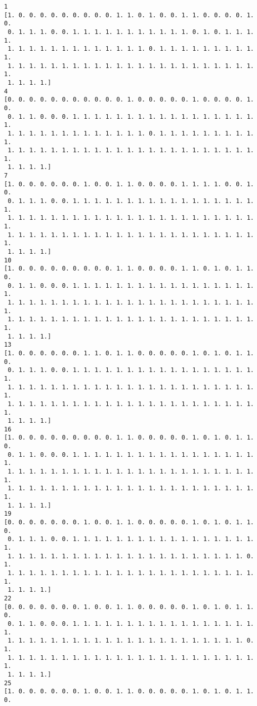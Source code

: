 \documentclass[11pt]{article}
\begin{document}
    \begin{Verbatim}[commandchars=\\\{\}]
1
[1. 0. 0. 0. 0. 0. 0. 0. 0. 0. 1. 1. 0. 1. 0. 0. 1. 1. 0. 0. 0. 0. 1. 0.
 0. 1. 1. 1. 0. 0. 1. 1. 1. 1. 1. 1. 1. 1. 1. 1. 1. 0. 1. 0. 1. 1. 1. 1.
 1. 1. 1. 1. 1. 1. 1. 1. 1. 1. 1. 1. 1. 0. 1. 1. 1. 1. 1. 1. 1. 1. 1. 1.
 1. 1. 1. 1. 1. 1. 1. 1. 1. 1. 1. 1. 1. 1. 1. 1. 1. 1. 1. 1. 1. 1. 1. 1.
 1. 1. 1. 1.]
4
[0. 0. 0. 0. 0. 0. 0. 0. 0. 0. 0. 1. 0. 0. 0. 0. 0. 1. 0. 0. 0. 0. 1. 0.
 0. 1. 1. 0. 0. 0. 1. 1. 1. 1. 1. 1. 1. 1. 1. 1. 1. 1. 1. 1. 1. 1. 1. 1.
 1. 1. 1. 1. 1. 1. 1. 1. 1. 1. 1. 1. 1. 0. 1. 1. 1. 1. 1. 1. 1. 1. 1. 1.
 1. 1. 1. 1. 1. 1. 1. 1. 1. 1. 1. 1. 1. 1. 1. 1. 1. 1. 1. 1. 1. 1. 1. 1.
 1. 1. 1. 1.]
7
[1. 0. 0. 0. 0. 0. 0. 1. 0. 0. 1. 1. 0. 0. 0. 0. 1. 1. 1. 1. 0. 0. 1. 0.
 0. 1. 1. 1. 0. 0. 1. 1. 1. 1. 1. 1. 1. 1. 1. 1. 1. 1. 1. 1. 1. 1. 1. 1.
 1. 1. 1. 1. 1. 1. 1. 1. 1. 1. 1. 1. 1. 1. 1. 1. 1. 1. 1. 1. 1. 1. 1. 1.
 1. 1. 1. 1. 1. 1. 1. 1. 1. 1. 1. 1. 1. 1. 1. 1. 1. 1. 1. 1. 1. 1. 1. 1.
 1. 1. 1. 1.]
10
[1. 0. 0. 0. 0. 0. 0. 0. 0. 0. 1. 1. 0. 0. 0. 0. 1. 1. 0. 1. 0. 1. 1. 0.
 0. 1. 1. 0. 0. 0. 1. 1. 1. 1. 1. 1. 1. 1. 1. 1. 1. 1. 1. 1. 1. 1. 1. 1.
 1. 1. 1. 1. 1. 1. 1. 1. 1. 1. 1. 1. 1. 1. 1. 1. 1. 1. 1. 1. 1. 1. 1. 1.
 1. 1. 1. 1. 1. 1. 1. 1. 1. 1. 1. 1. 1. 1. 1. 1. 1. 1. 1. 1. 1. 1. 1. 1.
 1. 1. 1. 1.]
13
[1. 0. 0. 0. 0. 0. 0. 1. 1. 0. 1. 1. 0. 0. 0. 0. 0. 1. 0. 1. 0. 1. 1. 0.
 0. 1. 1. 1. 0. 0. 1. 1. 1. 1. 1. 1. 1. 1. 1. 1. 1. 1. 1. 1. 1. 1. 1. 1.
 1. 1. 1. 1. 1. 1. 1. 1. 1. 1. 1. 1. 1. 1. 1. 1. 1. 1. 1. 1. 1. 1. 1. 1.
 1. 1. 1. 1. 1. 1. 1. 1. 1. 1. 1. 1. 1. 1. 1. 1. 1. 1. 1. 1. 1. 1. 1. 1.
 1. 1. 1. 1.]
16
[1. 0. 0. 0. 0. 0. 0. 0. 0. 0. 1. 1. 0. 0. 0. 0. 0. 1. 0. 1. 0. 1. 1. 0.
 0. 1. 1. 0. 0. 0. 1. 1. 1. 1. 1. 1. 1. 1. 1. 1. 1. 1. 1. 1. 1. 1. 1. 1.
 1. 1. 1. 1. 1. 1. 1. 1. 1. 1. 1. 1. 1. 1. 1. 1. 1. 1. 1. 1. 1. 1. 1. 1.
 1. 1. 1. 1. 1. 1. 1. 1. 1. 1. 1. 1. 1. 1. 1. 1. 1. 1. 1. 1. 1. 1. 1. 1.
 1. 1. 1. 1.]
19
[0. 0. 0. 0. 0. 0. 0. 1. 0. 0. 1. 1. 0. 0. 0. 0. 0. 1. 0. 1. 0. 1. 1. 0.
 0. 1. 1. 1. 0. 0. 1. 1. 1. 1. 1. 1. 1. 1. 1. 1. 1. 1. 1. 1. 1. 1. 1. 1.
 1. 1. 1. 1. 1. 1. 1. 1. 1. 1. 1. 1. 1. 1. 1. 1. 1. 1. 1. 1. 1. 1. 0. 1.
 1. 1. 1. 1. 1. 1. 1. 1. 1. 1. 1. 1. 1. 1. 1. 1. 1. 1. 1. 1. 1. 1. 1. 1.
 1. 1. 1. 1.]
22
[0. 0. 0. 0. 0. 0. 0. 1. 0. 0. 1. 1. 0. 0. 0. 0. 0. 1. 0. 1. 0. 1. 1. 0.
 0. 1. 1. 0. 0. 0. 1. 1. 1. 1. 1. 1. 1. 1. 1. 1. 1. 1. 1. 1. 1. 1. 1. 1.
 1. 1. 1. 1. 1. 1. 1. 1. 1. 1. 1. 1. 1. 1. 1. 1. 1. 1. 1. 1. 1. 1. 0. 1.
 1. 1. 1. 1. 1. 1. 1. 1. 1. 1. 1. 1. 1. 1. 1. 1. 1. 1. 1. 1. 1. 1. 1. 1.
 1. 1. 1. 1.]
25
[1. 0. 0. 0. 0. 0. 0. 1. 0. 0. 1. 1. 0. 0. 0. 0. 0. 1. 0. 1. 0. 1. 1. 0.

\end{Verbatim}
\end{document}
